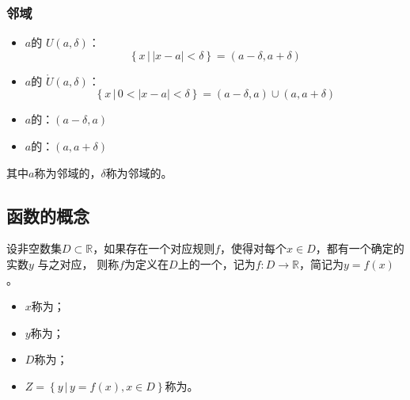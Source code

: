 \documentclass[14pt,notheorems,leqno,xcolor={rgb}]{beamer} %
\begin{document}

\begin{frame}
\frametitle{邻域}
\begin{itemize}
  \item $a$的 $U(a,\delta)$：$$\left\{x \,\big|\, |x-a|<\delta\right\}=(a-\delta,a+\delta)$$
  \item $a$的 $\mathring{U}(a,\delta)$：$$\left\{x \,\big|\, 0<|x-a|<\delta\right\}=(a-\delta,a)\cup(a,a+\delta)$$
\end{itemize}
\pause
\begin{itemize}
  \item $a$的：$(a-\delta,a)$
  \item $a$的：$(a,a+\delta)$
\end{itemize}
\pause
其中$a$称为邻域的，$\delta$称为邻域的。
\end{frame}

\subsection{函数的概念}

\begin{frame}
\begin{definition}
设非空数集$D\subset\mathbb{R}$，如果存在一个对应规则$f$，使得对每个$x\in D$，都有一个确定的实数$y$ 与之对应，
则称$f$为定义在$D$上的一个，记为$f:D\longrightarrow\mathbb{R}$，简记为$y=f(x)$。
\end{definition}%
\pause
\begin{itemize}
  \item $x$称为；
  \item $y$称为；
  \item $D$称为；
  \item $Z=\left\{y \,\big|\, y=f(x), x\in D\right\}$称为。
\end{itemize}
\end{frame}
\end{document}
